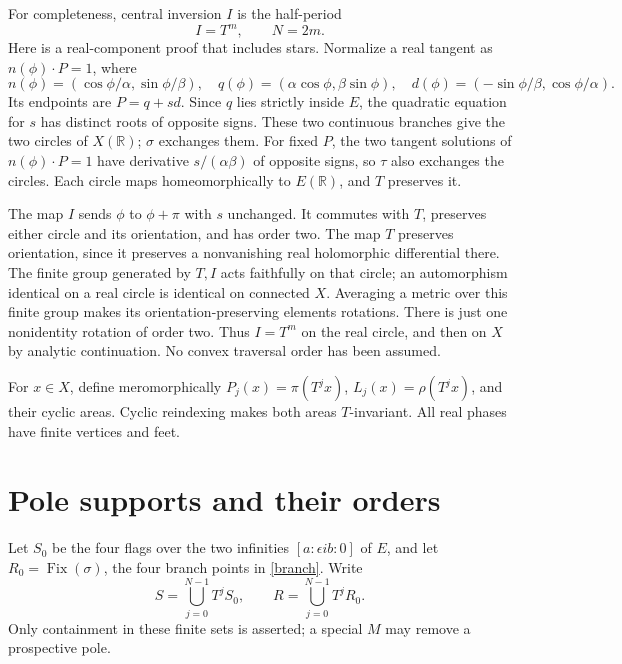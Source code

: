 \documentclass[11pt]{article}
\newcommand{\RR}{\mathbb R}
\begin{document}
For completeness, central inversion \(I\) is the half-period
\begin{equation}\label{central}
 I=T^m,\qquad N=2m .
\end{equation}
Here is a real-component proof that includes stars.
Normalize a real tangent as \(n(\phi)\cdot P=1\), where
\[
 n(\phi)=(\cos\phi/\alpha,\sin\phi/\beta),\quad
 q(\phi)=(\alpha\cos\phi,\beta\sin\phi),\quad
 d(\phi)=(-\sin\phi/\beta,\cos\phi/\alpha).
\]
Its endpoints are \(P=q+s d\).
Since \(q\) lies strictly inside \(E\), the quadratic equation for \(s\)
has distinct roots of opposite signs. These two continuous branches
give the two circles of \(X(\RR)\); \(\sigma\) exchanges them.
For fixed \(P\), the two tangent solutions of \(n(\phi)\cdot P=1\)
have derivative \(s/(\alpha\beta)\) of opposite signs, so \(\tau\)
also exchanges the circles. Each circle maps homeomorphically to
\(E(\RR)\), and \(T\) preserves it.

The map \(I\) sends \(\phi\) to \(\phi+\pi\) with \(s\) unchanged.
It commutes with \(T\), preserves either circle and its orientation,
and has order two. The map \(T\) preserves orientation, since it
preserves a nonvanishing real holomorphic differential there.
The finite group generated by \(T,I\) acts faithfully on that circle;
an automorphism identical on a real circle is identical on connected
\(X\). Averaging a metric over this finite group makes its
orientation-preserving elements rotations. There is just one
nonidentity rotation of order two. Thus \(I=T^m\) on the real circle,
and then on \(X\) by analytic continuation. No convex traversal
order has been assumed.

For \(x\in X\), define meromorphically
\(P_j(x)=\pi(T^jx)\), \(L_j(x)=\rho(T^jx)\), and their cyclic
areas. Cyclic reindexing makes both areas \(T\)-invariant.
All real phases have finite vertices and feet.

\section{Pole supports and their orders}
Let \(S_0\) be the four flags over the two infinities
\([a:\epsilon ib:0]\) of \(E\), and let
\(R_0=\operatorname{Fix}(\sigma)\), the four branch points in
\eqref{branch}. Write
\[
 S=\bigcup_{j=0}^{N-1}T^jS_0,\qquad
 R=\bigcup_{j=0}^{N-1}T^jR_0 .
\]
Only containment in these finite sets is asserted; a special \(M\)
may remove a prospective pole.
\end{document}
